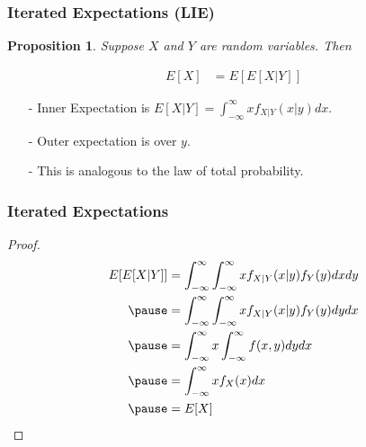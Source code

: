 \documentclass[aspectratio=169, handout]{beamer}
\newtheorem{prop}{Proposition}
\numberwithin{equation}{section}
\begin{document}
\begin{frame}
\frametitle{Iterated Expectations (LIE)}

\begin{prop}
Suppose $X$ and $Y$ are random variables.  Then 

\begin{align*}
E[X] &= E[E[X|Y]]  
\end{align*}


\end{prop}


\begin{itemize}
\item[-] Inner Expectation is $E[X|Y] = \int_{-\infty}^{\infty} x f_{X|Y} (x|y) dx$.  
\item[-] Outer expectation is over $y$.  
\item[-] This is analogous to the law of total probability.
\end{itemize}


\end{frame}


\begin{frame}
\frametitle{Iterated Expectations}

\begin{proof}
\begin{align*}
E[E[X|Y]] &= \int_{-\infty}^{\infty}  \int_{-\infty}^{\infty} x f_{X|Y} (x|y) f_{Y}(y) dx dy  \\ \pause 
&=  \int_{-\infty}^{\infty}  \int_{-\infty}^{\infty} x f_{X|Y} (x|y) f_{Y}(y) dy dx  \\ \pause 
&= \int_{-\infty}^{\infty} x \int_{-\infty}^{\infty}  f(x, y) dy dx   \\ \pause 
&= \int_{-\infty}^{\infty}  x f_{X}(x) dx   \\ \pause 
&= E[X]  
\end{align*}



\end{proof}
\end{frame}
\end{document}
